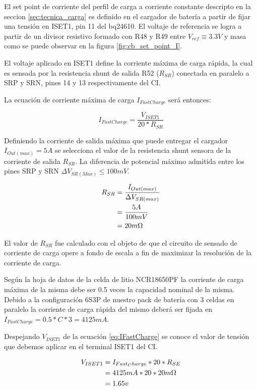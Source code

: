 \documentclass[10pt,a4paper]{article}
\begin{document}
El set point de corriente del perfil de carga a corriente constante descripto en
la seccion \ref{sec:tecnica_carga} es definido en el cargador de batería a
partir de fijar una tensión en ISET1, pin 11 del bq24610. El voltaje de
referencia se logra a partir de un divisor resistivo formado con R48 y R49 entre
$V_{ref} \equiv 3.3V$ y masa como se puede observar en la figura
\ref{fig:cb_set_point_I}. 

El voltaje aplicado en ISET1 define la corriente máxima de carga rápida, la cual
es sensada por la resistencia shunt de salida R52 ($R_{SR}$) conectada en
paralelo a SRP y SRN, pines 14 y 13 respectivamente del \acrshort{CI}.

La ecuación de corriente máxima de carga $I_{FastCharge}$ será entonces:

\begin{equation}
    I_{FastCharge}=\frac{V_{ISET1}}{20*R_{SR}}
    \label{eq:IFastCharge}
\end{equation}

Definiendo la corriente de salida máxima que puede entregar el cargador
$I_{Out (max)}=5A$ se selecciona el valor de la resistencia shunt sensora de la
corriente de salida $R_{SR}$. La diferencia de potencial máximo admitida entre
los pines SRP y SRN $\Delta V_{SR (Max)} \leq 100mV$.

\begin{align}
    R_{SR}&=\frac{I_{Out (max)}}{\Delta V_{SR (max)}}\\
    &=\frac{5A}{100mV}\\
    &=20m\ohm
\end{align}

El valor de $R_{SR}$ fue calculado con el objeto de que el circuito de sensado
de corriente de carga opere a fondo de escala a fin de maximizar la resolución
de la corriente de carga. 

Según la hoja de datos de la celda de litio NCR18650PF la corriente de
carga máxima de la misma debe ser 0.5 veces la capacidad nominal de la misma.
Debido a la configuración 6S3P de nuestro pack de batería con 3 celdas en
paralelo la corriente de carga rápida del mismo deberá ser fijada en $
I_{FastCharge}=0.5*C*3=4125mA$.

Despejando $V_{ISET1}$ de la ecuación \ref{eq:IFastCharge} se conoce el
valor de tensión que debemos aplicar en el terminal ISET1 del \acrshort{CI}.

\begin{align}
    V_{ISET1}&=I_{Fast_Charge}*20*R_{SE}\\
    &=4125mA*20*20m\ohm\\
    &=1.65v
\end{align}
\end{document}
